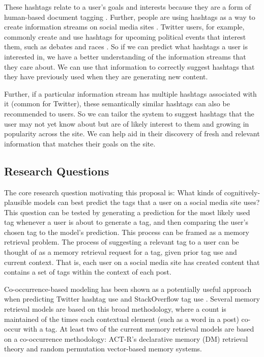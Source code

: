 \documentclass[man,floatsintext,donotrepeattitle]{apa6}
\begin{document}
These hashtags relate to a user's goals and interests because they are a form of human-based document tagging \parencite{Chang2010}.
Further, people are using hashtags as a way to create information streams on social media sites \parencite{Kwak2010}.
Twitter users, for example, commonly create and use hashtags for upcoming political events that interest them, such as debates and races \parencite{Diakopoulos2010}.
So if we can predict what hashtags a user is interested in, we have a better understanding of the information streams that they care about.
We can use that information to correctly suggest hashtags that they have previously used when they are generating new content.

Further, if a particular information stream has multiple hashtags associated with it (common for Twitter), these semantically similar hashtags can also be recommended to users.
So we can tailor the system to suggest hashtags that the user may not yet know about but are of likely interest to them and growing in popularity across the site.
We can help aid in their discovery of fresh and relevant information that matches their goals on the site.

\subsection{Research Questions}

The core research question motivating this proposal is:
What kinds of cognitively-plausible models can best predict the tags that a user on a social media site uses?
This question can be tested by generating a prediction for the most likely used tag whenever a user is about to generate a tag, and then comparing the user's chosen tag to the model's prediction.
This process can be framed as a memory retrieval problem.
The process of suggesting a relevant tag to a user can be thought of as a memory retrieval request for a tag, given prior tag use and current context.
That is, each user on a social media site has created content that contains a set of tags within the context of each post.

Co-occurrence-based modeling has been shown as a potentially useful approach when predicting Twitter hashtag use \parencite{Efron2010} and StackOverflow tag use \parencites{Stanley2013}.
Several memory retrieval models are based on this broad methodology, where a count is maintained of the times each contextual element (such as a word in a post) co-occur with a tag.
At least two of the current memory retrieval models are based on a co-occurrence methodology:
ACT-R's declarative memory (DM) retrieval theory and random permutation vector-based memory systems.
\end{document}
